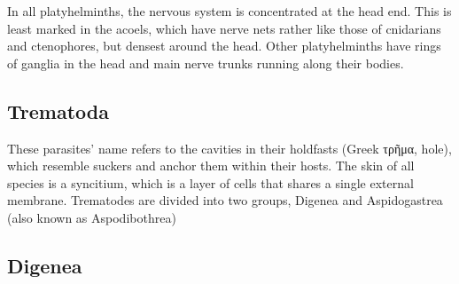 In all platyhelminths, the nervous system is concentrated at the head end. This is least marked in the acoels, which have nerve nets rather like those of cnidarians and ctenophores, but densest around the head. Other platyhelminths have rings of ganglia in the head and main nerve trunks running along their bodies.

\hypertarget{trematoda}{%
\subsection{Trematoda}\label{trematoda}}

These parasites' name refers to the cavities in their holdfasts (Greek τρῆμα, hole), which resemble suckers and anchor them within their hosts. The skin of all species is a syncitium, which is a layer of cells that shares a single external membrane. Trematodes are divided into two groups, Digenea and Aspidogastrea (also known as Aspodibothrea)

\hypertarget{digenea}{%
\subsection{Digenea}\label{digenea}}

